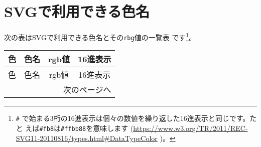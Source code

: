 \newcommand{\G}[4]{%
   \raisebox{-1mm}{\rule[-0.5mm]{0mm}{5.mm}%
    \fcolorbox[rgb]{0,0,0}{#4}{\rule{4mm}{0cm}\rule{0cm}{4mm}}}
   &#1
   &\TMP #2 &\texttt{#3}\\\hline}
\newcommand{\TBox}[1]{\makebox[2em][r]{#1}}
\def\TMP(#1,#2,#3){\texttt{rgb(\TBox{#1},\TBox{#2},\TBox{#3})}}
\newcommand{\RGB}[2]{}
\setlength{\fboxrule}{0.1mm}
\setlength{\fboxsep}{0mm}
\chapter{SVGで利用できる色名}\label{SVGColor}\setcounter{page}{1}\vspace*{-1em}
次の表はSVGで利用できる色名とその\texttt{rbg}値の一覧表
です\cite{SVG11}\footnote{
\texttt{\#} で始まる3桁の16進表示は個々の数値を繰り返した16進表示と同じです。たと
えば\protect\texttt{\#fb8}は\texttt{\#ffbb88}を意味します%
(\href{https://www.w3.org/TR/2011/REC-SVG11-20110816/types.html\#DataTypeColor}
{https://www.w3.org/TR/2011/REC-SVG11-20110816/types.html\#DataTypeColor}
)。}。
{\small
\begin{longtable}{|c|c|c|c|}
\hline
色&色名&rgb値&16進表示\\\hline
\endfirsthead
\hline
色&色名&rgb値&16進表示\\\hline
\endhead
\multicolumn{4}{r}{次のページへ}
\endfoot
\hline
\endlastfoot

\end{longtable}
}